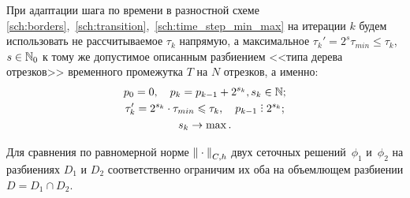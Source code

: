 При адаптации шага по времени в разностной схеме \eqref{sch:borders},~\eqref{sch:transition},~\eqref{sch:time_step_min_max} на итерации $k$ будем использовать не рассчитываемое $\tau_k$ напрямую, а максимальное $\tau_k' = 2^s \tau_{min} \leqslant \tau_k$, $s \in {\mathbb{N}}_0$ к тому же допустимое описанным разбиением <<типа дерева отрезков>> временного промежутка $T$ на $N$ отрезков, а именно:
\begin{gather*}
	p_0 = 0, \quad p_k = p_{k - 1} + 2^{s_k}, s_k \in \Natural; \\
	\tau_k' = 2^{s_k} \cdot \tau_{min} \leqslant \tau_k, \quad p_{k - 1} \divby 2^{s_k}; \\
	s_k \to \max.
\end{gather*}

Для сравнения по равномерной норме ${\| \cdot \|}_{C, h}$ двух сеточных решений~$\phi_1$ и~$\phi_2$ на разбиениях $D_1$ и $D_2$ соответственно ограничим их оба на объемлющем разбиении $D = D_1 \cap D_2$.